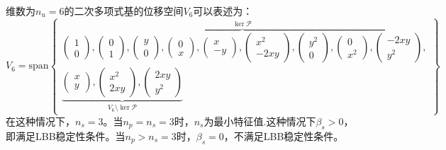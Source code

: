 维数为$n_u=6$的二次多项式基的位移空间$V_6$可以表述为：
\begin{equation}\label{ch_3:eq:base2}
    V_6 = \mathrm{span}
    \begin{Bmatrix}
        \overbrace{
        \begin{pmatrix} 1 \\ 0 \end{pmatrix},
        \begin{pmatrix} 0 \\ 1 \end{pmatrix},
        \begin{pmatrix} y \\ 0 \end{pmatrix},
        \begin{pmatrix} 0 \\ x \end{pmatrix},
        \begin{pmatrix} x \\ -y \end{pmatrix},
        \begin{pmatrix} x^2 \\ -2xy \end{pmatrix},
        \begin{pmatrix} y^2 \\ 0 \end{pmatrix},
        \begin{pmatrix} 0 \\ x^2 \end{pmatrix},
        \begin{pmatrix} -2xy \\ y^2 \end{pmatrix}
        }^{\ker \mathcal P}, \\
        \underbrace{
        \begin{pmatrix} x \\ y \end{pmatrix},
        \begin{pmatrix} x^2 \\ 2xy \end{pmatrix},
        \begin{pmatrix} 2xy \\ y^2 \end{pmatrix}
        }_{V_6\setminus \ker \mathcal P}
    \end{Bmatrix}
\end{equation}
在这种情况下，$n_s=3$。当$n_p=n_s=3$时，$n_s$为最小特征值.这种情况下$\beta_s>0$，即满足LBB稳定性条件。当$n_p>n_s=3$时，$\beta_s=0$，不满足LBB稳定性条件。

